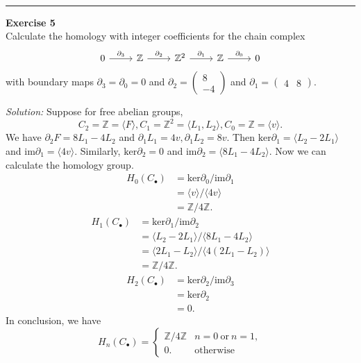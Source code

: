 \documentclass[a4paper, 11pt]{article}
\newenvironment{problem}[2][Exercise]
    { \begin{mdframed}[backgroundcolor=gray!20] \textbf{#1 #2} \\}
    {  \end{mdframed}}
\newenvironment{solution}
    {\textit{Solution:}}
    {}
\begin{document}
\\ 
\noindent\rule{7in}{2.8pt}
\begin{problem}{5}
Calculate the homology with integer coefficients for the chain complex 
$$\begin{tikzcd}
	0 & {\mathbb{Z}} & {\mathbb{Z}^2} & {\mathbb{Z}} & 0
	\arrow["{\partial_3}", from=1-1, to=1-2]
	\arrow["{\partial_2}", from=1-2, to=1-3]
	\arrow["{\partial_1}", from=1-3, to=1-4]
	\arrow["{\partial_0}", from=1-4, to=1-5]
\end{tikzcd}$$
with boundary maps \(\partial_3=\partial_0=0\) and \(\partial_2=\begin{pmatrix}
     8\\
    -4
\end{pmatrix}\) and \(\partial_1=\begin{pmatrix}
    4 & 8
\end{pmatrix}\).
\end{problem}
\begin{solution}
Suppose for free abelian groups, 
$$C_2=\mathbb{Z}=\langle F\rangle, C_1=\mathbb{Z}^2=\langle L_1,L_2\rangle, C_0=\mathbb{Z}=\langle v\rangle.$$
We have \(\partial_2 F=8L_1-4L_2\) and \(\partial_1 L_1=4v, \partial_1 L_2=8v\). Then \(\text{ker}\partial_1=\langle L_2-2L_1\rangle\) and \(\text{im}\partial_1=\langle 4v\rangle\). 
Similarly, \(\text{ker}\partial_2=0\) and \(\text{im}\partial_2=\langle 8L_1-4L_2\rangle\). Now we can calculate the homology group.
\begin{align*}
    H_0(C_\bullet) & = \text{ker}\partial_0/\text{im}\partial_1\\ 
                   & = \langle v\rangle / \langle 4v\rangle \\ 
                   & = \mathbb{Z}/4 \mathbb{Z}.
\end{align*}
\begin{align*}
    H_1(C_\bullet) & = \text{ker}\partial_1/\text{im}\partial_2\\ 
                   & = \langle L_2-2L_1\rangle /\langle 8L_1-4L_2\rangle \\ 
                   & = \langle 2L_1-L_2\rangle /\langle 4(2L_1-L_2)\rangle \\ 
                   & = \mathbb{Z}/4 \mathbb{Z}.
\end{align*}
\begin{align*}
    H_2(C_\bullet) & = \text{ker}\partial_2/\text{im}\partial_3 \\ 
                   & =\text{ker}\partial_2\\ 
                   & =0.
\end{align*}
In conclusion, we have 
$$H_n(C_\bullet)=\begin{cases}
    \mathbb{Z}/4 \mathbb{Z} & n=0\ \text{or} \ n=1,\\ 
     0. & \text{otherwise} 
\end{cases}$$
\end{solution}
\end{document}
